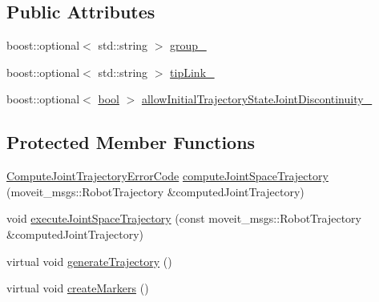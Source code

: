 \subsection*{Public Attributes}
\begin{DoxyCompactItemize}
\item 
boost\+::optional$<$ std\+::string $>$ \hyperlink{classcl__move__group__interface_1_1CbMoveEndEffectorTrajectory_aa247cf74c1d4878bacecba836a839fa7}{group\+\_\+}
\item 
boost\+::optional$<$ std\+::string $>$ \hyperlink{classcl__move__group__interface_1_1CbMoveEndEffectorTrajectory_a24c6c30b9b0761a61fa002d947bd3e11}{tip\+Link\+\_\+}
\item 
boost\+::optional$<$ \hyperlink{classbool}{bool} $>$ \hyperlink{classcl__move__group__interface_1_1CbMoveEndEffectorTrajectory_a01e02533602d045538fd8ccc9a011ea7}{allow\+Initial\+Trajectory\+State\+Joint\+Discontinuity\+\_\+}
\end{DoxyCompactItemize}
\subsection*{Protected Member Functions}
\begin{DoxyCompactItemize}
\item 
\hyperlink{namespacecl__move__group__interface_ae5fc1caf9a16ae5ad1c97c2e137a7017}{Compute\+Joint\+Trajectory\+Error\+Code} \hyperlink{classcl__move__group__interface_1_1CbMoveEndEffectorTrajectory_a485057c052729edd3e8303440b7ada66}{compute\+Joint\+Space\+Trajectory} (moveit\+\_\+msgs\+::\+Robot\+Trajectory \&computed\+Joint\+Trajectory)
\item 
void \hyperlink{classcl__move__group__interface_1_1CbMoveEndEffectorTrajectory_a3a75fa185c62591e1869427650338a32}{execute\+Joint\+Space\+Trajectory} (const moveit\+\_\+msgs\+::\+Robot\+Trajectory \&computed\+Joint\+Trajectory)
\item 
virtual void \hyperlink{classcl__move__group__interface_1_1CbMoveEndEffectorTrajectory_aeae938ab66e18ab7d2fb2427bc83647b}{generate\+Trajectory} ()
\item 
virtual void \hyperlink{classcl__move__group__interface_1_1CbMoveEndEffectorTrajectory_a442efa1d5bc9e9a16f74ecd31b13d9b5}{create\+Markers} ()
\end{DoxyCompactItemize}
